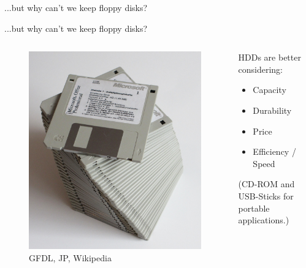 \documentclass[12pt]{beamer}
\newlength{\wideitemsep}
\let\olditem\item
\renewcommand{\item}{\setlength{\itemsep}{\wideitemsep}\olditem}
\begin{document}
\begin{frame}[standout]
	...but why can't we keep floppy disks?
\end{frame}
\begin{frame}[fragile]{...but why can't we keep floppy disks?}
	
	 \begin{columns}[c]
	 	\begin{column}[c]{.5\textwidth}
	 		\begin{figure}[p]
	 			\centering
	 			\includegraphics[width=\linewidth]{img/floppy_ms_office_crop.jpg}
	 			\caption{GFDL, JP, Wikipedia}
	 		\end{figure}
	 	\end{column}
	 	\begin{column}[c]{.5\textwidth}
	 		HDDs are better considering:
	 		\begin{itemize}
	 			\item Capacity
	 			\item Durability
	 			\item Price
	 			\item Efficiency / Speed
	 		\end{itemize}
	 		
		 	\hfill
		 	
		 	(CD-ROM and USB-Sticks for portable applications.)
	 	\end{column}
	 \end{columns}
\end{frame}
\end{document}
